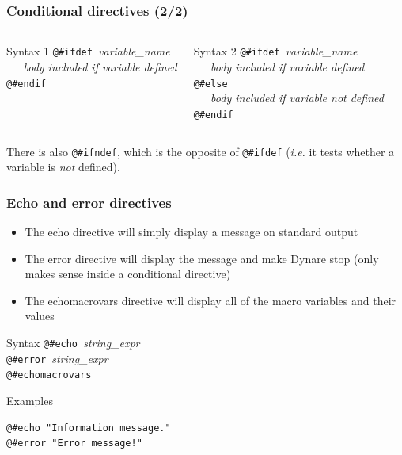 \documentclass{beamer}
\begin{document}
\begin{frame}[fragile=singleslide]
  \frametitle{Conditional directives (2/2)}

  \begin{columns}[T]
    \begin{block}{Syntax 1}
\verb+@#ifdef +\textit{variable\_name} \\
\verb+   +\textit{body included if variable defined} \\
\verb+@#endif+
    \end{block}

    \begin{block}{Syntax 2}
\verb+@#ifdef +\textit{variable\_name} \\
\verb+   +\textit{body included if variable defined} \\
\verb+@#else+ \\
\verb+   +\textit{body included if variable not defined} \\
\verb+@#endif+
    \end{block}
  \end{columns}

\bigskip

There is also \verb+@#ifndef+, which is the opposite of \verb+@#ifdef+
(\textit{i.e.} it tests whether a variable is \emph{not} defined).
\end{frame}

\begin{frame}[fragile=singleslide]
  \frametitle{Echo and error directives}

  \begin{itemize}
  \item The echo directive will simply display a message on standard output
  \item The error directive will display the message and make Dynare stop (only makes sense inside a conditional directive)
  \item The echomacrovars directive will display all of the macro variables and their values
  \end{itemize}

  \begin{block}{Syntax}
\verb+@#echo +\textit{string\_expr} \\
\verb+@#error +\textit{string\_expr} \\
\verb+@#echomacrovars +
  \end{block}

  \begin{block}{Examples}
\begin{verbatim}
@#echo "Information message."
@#error "Error message!"
\end{verbatim}
  \end{block}
\end{frame}
\end{document}
